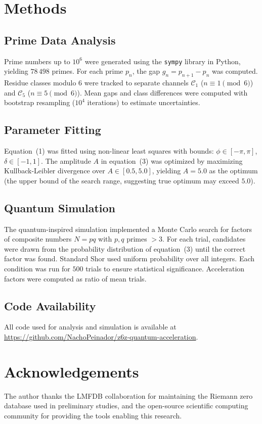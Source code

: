 \documentclass[pdflatex,sn-nature]{sn-jnl}
\theoremstyle{thmstyleone}
\theoremstyle{thmstyletwo}
\theoremstyle{thmstylethree}
\begin{document}
\section*{Methods}

\subsection*{Prime Data Analysis}
Prime numbers up to $10^6$ were generated using the \texttt{sympy} library in Python, yielding $78\,498$ primes. For each prime $p_n$, the gap $g_n = p_{n+1} - p_n$ was computed. Residue classes modulo $6$ were tracked to separate channels $\mathcal{C}_1$ ($n\equiv1\pmod{6}$) and $\mathcal{C}_5$ ($n\equiv5\pmod{6}$). Mean gaps and class differences were computed with bootstrap resampling ($10^4$ iterations) to estimate uncertainties.

\subsection*{Parameter Fitting}
Equation~(1) was fitted using non-linear least squares with bounds: $\phi\in[-\pi,\pi]$, $\delta\in[-1,1]$. The amplitude $A$ in equation~(3) was optimized by maximizing Kullback-Leibler divergence over $A\in[0.5,5.0]$, yielding $A=5.0$ as the optimum (the upper bound of the search range, suggesting true optimum may exceed $5.0$).

\subsection*{Quantum Simulation}
The quantum-inspired simulation implemented a Monte Carlo search for factors of composite numbers $N=pq$ with $p,q$ primes $>3$. For each trial, candidates were drawn from the probability distribution of equation~(3) until the correct factor was found. Standard Shor used uniform probability over all integers. Each condition was run for $500$ trials to ensure statistical significance. Acceleration factors were computed as ratio of mean trials.

\subsection*{Code Availability}
All code used for analysis and simulation is available at \url{https://github.com/NachoPeinador/z6z-quantum-acceleration}.

\section*{Acknowledgements}
The author thanks the LMFDB collaboration for maintaining the Riemann zero database used in preliminary studies, and the open-source scientific computing community for providing the tools enabling this research.
\end{document}
